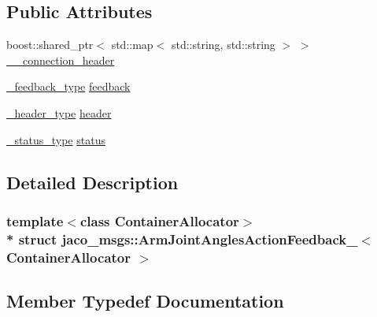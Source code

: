 \subsection*{Public Attributes}
\begin{DoxyCompactItemize}
\item 
boost\+::shared\+\_\+ptr$<$ std\+::map$<$ std\+::string, std\+::string $>$ $>$ \hyperlink{structjaco__msgs_1_1ArmJointAnglesActionFeedback___a1f1c6167110eadff03926fa05bde058a}{\+\_\+\+\_\+connection\+\_\+header}
\item 
\hyperlink{structjaco__msgs_1_1ArmJointAnglesActionFeedback___a7256b5b631f5765fd7a67cbd8dfe5b47}{\+\_\+feedback\+\_\+type} \hyperlink{structjaco__msgs_1_1ArmJointAnglesActionFeedback___a1bdadb7a4a611607e135e734a94fb74a}{feedback}
\item 
\hyperlink{structjaco__msgs_1_1ArmJointAnglesActionFeedback___a6607c88f7d652054e5c5295d2b0f2c1d}{\+\_\+header\+\_\+type} \hyperlink{structjaco__msgs_1_1ArmJointAnglesActionFeedback___a2b6e6babc148c8a60d9c87aec1345010}{header}
\item 
\hyperlink{structjaco__msgs_1_1ArmJointAnglesActionFeedback___aab3ce75e46a0b19c8699b2d683d7bf1d}{\+\_\+status\+\_\+type} \hyperlink{structjaco__msgs_1_1ArmJointAnglesActionFeedback___a3ad6f5a7e798c60a78a6ffcb225a20a0}{status}
\end{DoxyCompactItemize}


\subsection{Detailed Description}
\subsubsection*{template$<$class Container\+Allocator$>$\\*
struct jaco\+\_\+msgs\+::\+Arm\+Joint\+Angles\+Action\+Feedback\+\_\+$<$ Container\+Allocator $>$}



\subsection{Member Typedef Documentation}
